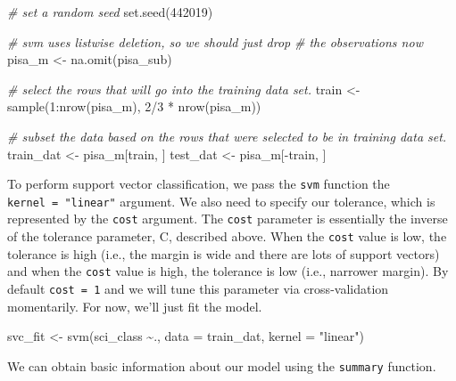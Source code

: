 \documentclass[
]{book}
\newenvironment{Shaded}{\begin{snugshade}}{\end{snugshade}}
\newcommand{\AttributeTok}[1]{\textcolor[rgb]{0.77,0.63,0.00}{#1}}
\newcommand{\CommentTok}[1]{\textcolor[rgb]{0.56,0.35,0.01}{\textit{#1}}}
\newcommand{\DecValTok}[1]{\textcolor[rgb]{0.00,0.00,0.81}{#1}}
\newcommand{\FunctionTok}[1]{\textcolor[rgb]{0.00,0.00,0.00}{#1}}
\newcommand{\NormalTok}[1]{#1}
\newcommand{\OtherTok}[1]{\textcolor[rgb]{0.56,0.35,0.01}{#1}}
\newcommand{\SpecialCharTok}[1]{\textcolor[rgb]{0.00,0.00,0.00}{#1}}
\newcommand{\StringTok}[1]{\textcolor[rgb]{0.31,0.60,0.02}{#1}}
\begin{document}
\begin{Shaded}
\begin{Highlighting}[]
\CommentTok{\# set a random seed}
\FunctionTok{set.seed}\NormalTok{(}\DecValTok{442019}\NormalTok{)}

\CommentTok{\# svm uses listwise deletion, so we should just drop}
\CommentTok{\# the observations now}
\NormalTok{pisa\_m }\OtherTok{\textless{}{-}} \FunctionTok{na.omit}\NormalTok{(pisa\_sub)}

\CommentTok{\# select the rows that will go into the training data set.}
\NormalTok{train }\OtherTok{\textless{}{-}} \FunctionTok{sample}\NormalTok{(}\DecValTok{1}\SpecialCharTok{:}\FunctionTok{nrow}\NormalTok{(pisa\_m), }\DecValTok{2}\SpecialCharTok{/}\DecValTok{3} \SpecialCharTok{*} \FunctionTok{nrow}\NormalTok{(pisa\_m))}

\CommentTok{\# subset the data based on the rows that were selected to be in training data set.}
\NormalTok{train\_dat }\OtherTok{\textless{}{-}}\NormalTok{ pisa\_m[train, ]}
\NormalTok{test\_dat }\OtherTok{\textless{}{-}}\NormalTok{ pisa\_m[}\SpecialCharTok{{-}}\NormalTok{train, ]}
\end{Highlighting}
\end{Shaded}

To perform support vector classification, we pass the \texttt{svm} function the \texttt{kernel\ =\ "linear"} argument. We also need to specify our tolerance, which is represented by the \texttt{cost} argument. The \texttt{cost} parameter is essentially the inverse of the tolerance parameter, C, described above. When the \texttt{cost} value is low, the tolerance is high (i.e., the margin is wide and there are lots of support vectors) and when the \texttt{cost} value is high, the tolerance is low (i.e., narrower margin). By default \texttt{cost\ =\ 1} and we will tune this parameter via cross-validation momentarily. For now, we'll just fit the model.

\begin{Shaded}
\begin{Highlighting}[]
\NormalTok{svc\_fit }\OtherTok{\textless{}{-}} \FunctionTok{svm}\NormalTok{(sci\_class }\SpecialCharTok{\textasciitilde{}}\NormalTok{., }\AttributeTok{data =}\NormalTok{ train\_dat, }\AttributeTok{kernel =} \StringTok{"linear"}\NormalTok{)}
\end{Highlighting}
\end{Shaded}

We can obtain basic information about our model using the \texttt{summary} function.
\end{document}
